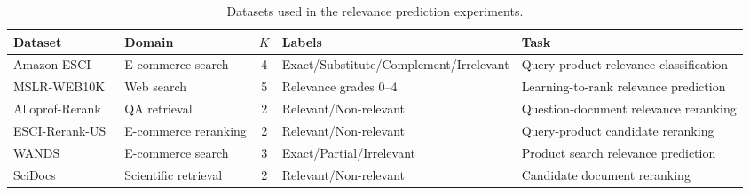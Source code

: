 \begin{table}[t]
\centering
\small
\caption{Datasets used in the relevance prediction experiments.}
\label{tab:datasets}
\begin{tabular}{llcll}
\toprule
Dataset & Domain & \(K\) & Labels & Task \\
\midrule
Amazon ESCI~\citep{reddy2022shopping}
& E-commerce search
& 4
& Exact/Substitute/Complement/Irrelevant
& Query-product relevance classification \\
\addlinespace[2pt]
MSLR-WEB10K~\citep{microsoft2010mslr}
& Web search
& 5
& Relevance grades 0--4
& Learning-to-rank relevance prediction \\
\addlinespace[2pt]
Alloprof-Rerank~\citep{lefebvre2023alloprof}
& QA retrieval
& 2
& Relevant/Non-relevant
& Question-document relevance reranking \\
\addlinespace[2pt]
ESCI-Rerank-US~\citep{reddy2022shopping}
& E-commerce reranking
& 2
& Relevant/Non-relevant
& Query-product candidate reranking \\
\addlinespace[2pt]
WANDS~\citep{chen2022wands}
& E-commerce search
& 3
& Exact/Partial/Irrelevant
& Product search relevance prediction \\
\addlinespace[2pt]
SciDocs~\citep{cohan2020specter,thakur2021beir}
& Scientific retrieval
& 2
& Relevant/Non-relevant
& Candidate document reranking \\
\bottomrule
\end{tabular}
\end{table}
